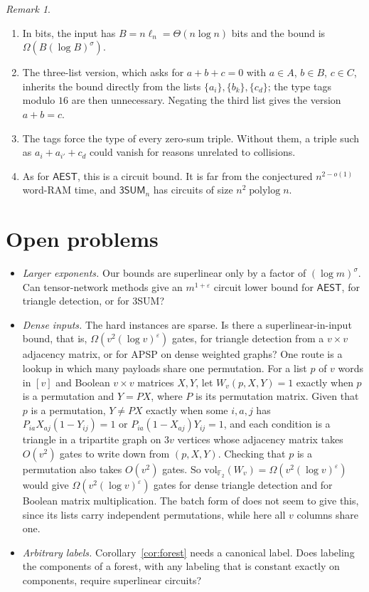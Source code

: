 \documentclass[11pt]{article}
\theoremstyle{definition}
\theoremstyle{remark}
\newtheorem{remark}[theorem]{Remark}
\newcommand{\vol}{\mathrm{vol}}
\newcommand{\F}{\mathbb{F}}
\newcommand{\AEST}{\mathsf{AEST}}
\newcommand{\TSUM}{\mathsf{3SUM}}
\begin{document}
\begin{remark}
\begin{enumerate}
\item In bits, the input has $B=n\ell_n=\Theta(n\log n)$ bits and the
bound is $\Omega(B(\log B)^\sigma)$.
\item The three-list version, which asks for $a+b+c=0$ with $a\in A$,
$b\in B$, $c\in C$, inherits the bound directly from the lists
$\{a_i\},\{b_k\},\{c_d\}$; the type tags modulo $16$ are then
unnecessary. Negating the third list gives the version $a+b=c$.
\item The tags force the type of every zero-sum triple. Without them, a
triple such as $a_i+a_{i'}+c_d$ could vanish for reasons unrelated to
collisions.
\item As for $\AEST$, this is a circuit bound. It is far from the
conjectured $n^{2-o(1)}$ word-RAM time, and $\TSUM_n$ has circuits of size
$n^2\operatorname{polylog}n$.
\end{enumerate}
\end{remark}

\section{Open problems}\label{sec:open}
\begin{itemize}
\item \emph{Larger exponents.} Our bounds are superlinear only by a factor
of $(\log m)^{\sigma}$. Can tensor-network methods give an
$m^{1+\varepsilon}$ circuit lower bound for $\AEST$, for triangle
detection, or for 3SUM?
\item \emph{Dense inputs.} The hard instances are sparse. Is there a
superlinear-in-input bound, that is, $\Omega(v^2(\log v)^{\varepsilon})$
gates, for triangle detection from a $v\times v$ adjacency matrix, or for
APSP on dense weighted graphs? One route is a lookup in which many
payloads share one permutation. For a list $p$ of $v$ words in $[v]$ and
Boolean $v\times v$ matrices $X,Y$, let $W_v(p,X,Y)=1$ exactly when $p$ is
a permutation and $Y=PX$, where $P$ is its permutation matrix. Given that
$p$ is a permutation, $Y\ne PX$ exactly when some $i,a,j$ has
$P_{ia}X_{aj}(1-Y_{ij})=1$ or $P_{ia}(1-X_{aj})Y_{ij}=1$, and each
condition is a triangle in a tripartite graph on $3v$ vertices whose
adjacency matrix takes $O(v^2)$ gates to write down from $(p,X,Y)$.
Checking that $p$ is a permutation also takes $O(v^2)$ gates. So
$\vol_{\F_2}(W_v)=\Omega(v^2(\log v)^{\varepsilon})$ would give
$\Omega(v^2(\log v)^{\varepsilon})$ gates for dense triangle detection
and for Boolean matrix multiplication. The batch form of
\cite[Theorem~2.2]{OAI} does not seem to give this, since its lists
carry independent permutations, while here all $v$ columns share one.
\item \emph{Arbitrary labels.} Corollary~\ref{cor:forest} needs a
canonical label. Does labeling the components of a forest, with any
labeling that is constant exactly on components, require superlinear
circuits?
\end{itemize}
\end{document}

